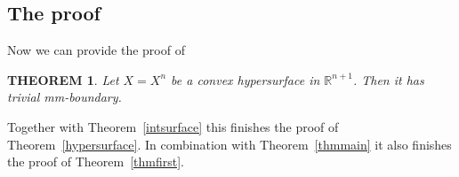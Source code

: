 \documentclass[12pt,leqno,intlimits]{amsart}
\numberwithin{equation}{section}
\newtheorem{thm}{THEOREM}[section]
\theoremstyle{definition}
\theoremstyle{remark}
\newcommand{\tref}[1]{Theorem~\ref{#1}}
\newcommand{\R}{\mathbb{R}}
\begin{document}
\subsection{The proof} Now we can provide the proof of
\begin{thm} \label{thmconv}
Let $X=X^n$ be a convex hypersurface in $\R^{n+1}$.  Then it has trivial mm-boundary.

\end{thm}
Together with \tref{intsurface} this finishes the proof of \tref{hypersurface}. 
In combination with \tref{thmmain} it also finishes the proof of \tref{thmfirst}.
\end{document}
